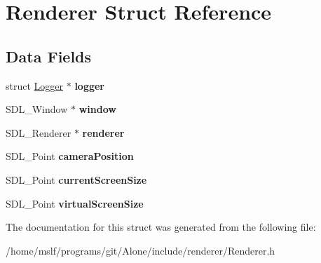 \hypertarget{struct_renderer}{}\section{Renderer Struct Reference}
\label{struct_renderer}
\subsection*{Data Fields}
\begin{DoxyCompactItemize}
\item 
\hypertarget{struct_renderer_af4d650f26e6e1a4b53c751abc1eff45e}{}\label{struct_renderer_af4d650f26e6e1a4b53c751abc1eff45e} 
struct \hyperlink{struct_logger}{Logger} $\ast$ {\bfseries logger}
\item 
\hypertarget{struct_renderer_aaa8e409e04dcf575ef63fd5fb3db06f9}{}\label{struct_renderer_aaa8e409e04dcf575ef63fd5fb3db06f9} 
S\+D\+L\+\_\+\+Window $\ast$ {\bfseries window}
\item 
\hypertarget{struct_renderer_a966da7a60c4ea3ba301e26ccc5efe452}{}\label{struct_renderer_a966da7a60c4ea3ba301e26ccc5efe452} 
S\+D\+L\+\_\+\+Renderer $\ast$ {\bfseries renderer}
\item 
\hypertarget{struct_renderer_a100180e2e1f4392fe765aa7e5b800215}{}\label{struct_renderer_a100180e2e1f4392fe765aa7e5b800215} 
S\+D\+L\+\_\+\+Point {\bfseries camera\+Position}
\item 
\hypertarget{struct_renderer_aa5fcda74f70efa26b808237cba88d273}{}\label{struct_renderer_aa5fcda74f70efa26b808237cba88d273} 
S\+D\+L\+\_\+\+Point {\bfseries current\+Screen\+Size}
\item 
\hypertarget{struct_renderer_a43723e61c3f9430011b1fee41436e6ae}{}\label{struct_renderer_a43723e61c3f9430011b1fee41436e6ae} 
S\+D\+L\+\_\+\+Point {\bfseries virtual\+Screen\+Size}
\end{DoxyCompactItemize}


The documentation for this struct was generated from the following file\+:\begin{DoxyCompactItemize}
\item 
/home/mslf/programs/git/\+Alone/include/renderer/Renderer.\+h\end{DoxyCompactItemize}
